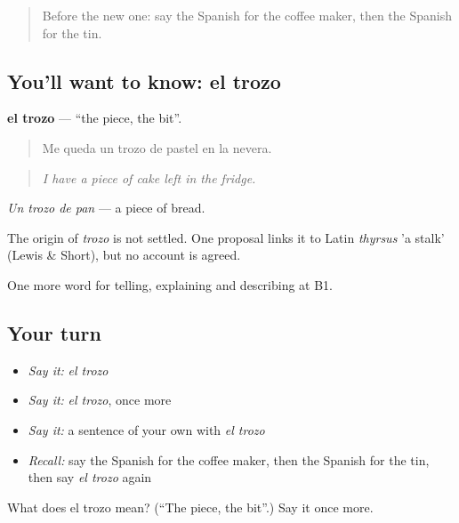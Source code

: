 \begin{quote}
Before the new one: say the Spanish for the coffee maker, then the Spanish for the tin.
\end{quote}

\subsection*{You'll want to know: el trozo}
\textbf{el trozo} — \textquotedblleft{}the piece, the bit\textquotedblright{}.

\begin{quote}
Me queda un trozo de pastel en la nevera.
\end{quote}

\begin{quote}
\emph{I have a piece of cake left in the fridge.}
\end{quote}

\emph{Un trozo de pan} — a piece of bread.

\begin{cousinweb}
The origin of \emph{trozo} is not settled. One proposal links it to Latin \emph{thyrsus} 'a stalk' (Lewis \& Short), but no account is agreed.
\end{cousinweb}

\begin{grammarlens}[title={What you've built}]
One more word for telling, explaining and describing at B1.
\end{grammarlens}

\subsection*{Your turn}
\begin{itemize}
\raggedright
  \item \emph{Say it:} \emph{el trozo}
  \item \emph{Say it:} \emph{el trozo}, once more
  \item \emph{Say it:} a sentence of your own with \emph{el trozo}
  \item \emph{Recall:} say the Spanish for the coffee maker, then the Spanish for the tin, then say \emph{el trozo} again
\end{itemize}

\begin{tcolorbox}[breakable,colback=teal!4,colframe=teal!35!black,title={Before you move on}]
What does el trozo mean? (\textquotedblleft{}The piece, the bit\textquotedblright{}.) Say it once more.
\end{tcolorbox}
